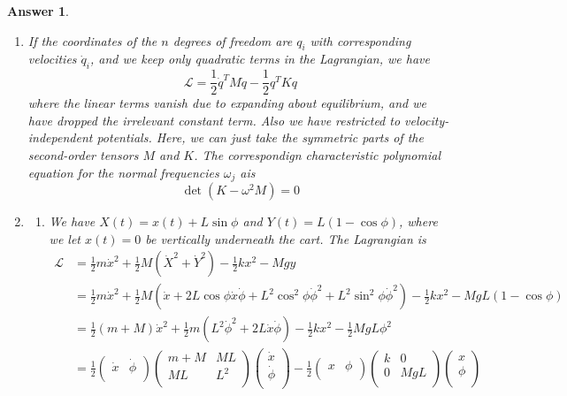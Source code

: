 \documentclass[a4paper]{article}
\newtheorem{ans}{Answer}[section]
\theoremstyle{new}
\begin{document}
\begin{ans}\leavevmode
\begin{enumerate}[label=(\alph*)]
\item If the coordinates of the $n$ degrees of freedom are $q_i$ with corresponding velocities $\dot{q}_i$, and we keep only quadratic terms in the Lagrangian, we have
$$\mathcal{L}=\frac{1}{2}\dot{q}^TM\dot{q}-\frac{1}{2}q^TKq$$
where the linear terms vanish due to expanding about equilibrium, and we have dropped the irrelevant constant term. Also we have restricted to velocity-independent potentials. Here, we can just take the symmetric parts of the second-order tensors $M$ and $K$. The correspondign characteristic polynomial equation for the normal frequencies $\omega_j$ ais
$$\det(K-\omega^2M)=0$$
\item 
\begin{enumerate}[label=(\roman*)]
\item We have $X(t)=x(t)+L\sin\phi$ and $Y(t)=L(1-\cos\phi)$, where we let $x(t)=0$ be vertically underneath the cart. The Lagrangian is
\begin{align}
    \mathcal{L}&=\frac{1}{2}m\dot{x}^2+\frac{1}{2}M(\dot{X}^2+\dot{Y}^2)-\frac{1}{2}kx^2-Mgy\nonumber\\&=\frac{1}{2}m\dot{x}^2+\frac{1}{2}M(\dot{x}+2L\cos\phi\dot{x}\dot{\phi}+L^2\cos^2\phi\dot{\phi}^2+L^2\sin^2\phi\dot{\phi}^2)-\frac{1}{2}kx^2-MgL(1-\cos\phi)\nonumber\\&=\frac{1}{2}(m+M)\dot{x}^2+\frac{1}{2}m(L^2\dot{\phi}^2+2L\dot{x}\dot{\phi})-\frac{1}{2}kx^2-\frac{1}{2}MgL\phi^2\nonumber\\&=\frac{1}{2}\begin{pmatrix}\dot{x}&\dot{\phi}\\\end{pmatrix}\begin{pmatrix}m+M&ML\\ML&L^2\\\end{pmatrix}\begin{pmatrix}\dot{x}\\\dot{\phi}\\\end{pmatrix}-\frac{1}{2}\begin{pmatrix}x&\phi\\\end{pmatrix}\begin{pmatrix}k&0\\0&MgL\\\end{pmatrix}\begin{pmatrix}x\\\phi\\\end{pmatrix}\nonumber

\end{align}
\end{enumerate}
\end{enumerate}
\end{ans}
\end{document}
